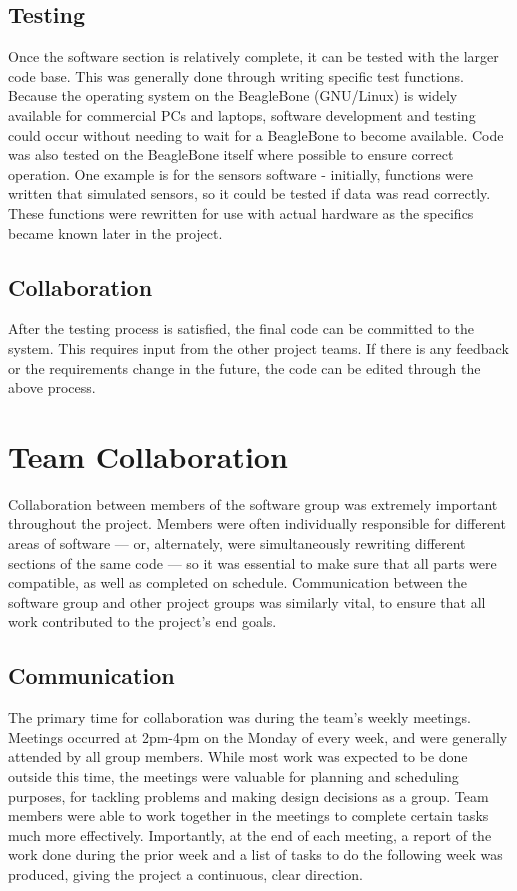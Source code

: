 \subsection{Testing}

Once the software section is relatively complete, it can be tested with the larger code base. This was generally done through writing specific test functions. Because the operating system on the BeagleBone (GNU/Linux) is widely available for commercial PCs and laptops, software development and testing could occur without needing to wait for a BeagleBone to become available. Code was also tested on the BeagleBone itself where possible to ensure correct operation. One example is for the sensors software - initially, functions were written that simulated sensors, so it could be tested if data was read correctly. These functions were rewritten for use with actual hardware as the specifics became known later in the project.

\subsection{Collaboration}
After the testing process is satisfied, the final code can be committed to the system. This requires input from the other project teams. If there is any feedback or the requirements change in the future, the code can be edited through the above process.

\section{Team Collaboration}

Collaboration between members of the software group was extremely important throughout the project. Members were often individually responsible for different areas of software --- or, alternately, were simultaneously rewriting different sections of the same code --- so it was essential to make sure that all parts were compatible, as well as completed on schedule. Communication between the software group and other project groups was similarly vital, to ensure that all work contributed to the project's end goals. 

\subsection{Communication} \label{Communication}
The primary time for collaboration was during the team's weekly meetings. Meetings occurred at 2pm-4pm on the Monday of every week, and were generally attended by all group members. While most work was expected to be done outside this time, the meetings were valuable for planning and scheduling purposes, for tackling problems and making design decisions as a group. Team members were able to work together in the meetings to complete certain tasks much more effectively. Importantly, at the end of each meeting, a report of the work done during the prior week and a list of tasks to do the following week was produced, giving the project a continuous, clear direction. 

